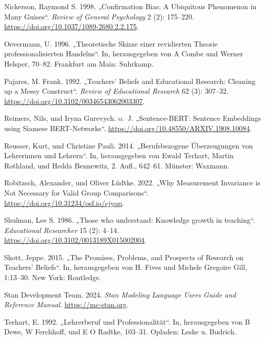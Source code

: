 \documentclass[
  letterpaper,
  DIV=11]{scrartcl}
\newlength{\cslhangindent}
\newenvironment{CSLReferences}[2] %
 {\begin{list}{}{%
  \setlength{\itemindent}{0pt}
  \setlength{\leftmargin}{0pt}
  \setlength{\parsep}{0pt}
  \ifodd #1
   \setlength{\leftmargin}{\cslhangindent}
   \setlength{\itemindent}{-1\cslhangindent}
  \fi
  \setlength{\itemsep}{#2\baselineskip}}}
 {\end{list}}
\begin{document}
\begin{CSLReferences}{1}{0}
Nickerson, Raymond S. 1998. {„Confirmation Bias: {A} Ubiquitous
Phenomenon in Many Guises``}. \emph{Review of General Psychology} 2 (2):
175--220. \url{https://doi.org/10.1037/1089-2680.2.2.175}.

Oevermann, U. 1996. {„Theoretische Skizze einer revidierten Theorie
professionalisierten Handelns``}. In, herausgegeben von A Combe und
Werner Helsper, 70--82. Frankfurt am Main: Suhrkamp.

Pajares, M. Frank. 1992. {„Teachers{'} Beliefs and Educational Research:
Cleaning up a Messy Construct``}. \emph{Review of Educational Research}
62 (3): 307--32. \url{https://doi.org/10.3102/00346543062003307}.

Reimers, Nils, und Iryna Gurevych. o.~J. {„Sentence-BERT: Sentence
Embeddings using Siamese BERT-Networks``}.
\url{https://doi.org/10.48550/ARXIV.1908.10084}.

Reusser, Kurt, und Christine Pauli. 2014. {„Berufsbezogene Überzeugungen
von Lehrerinnen und Lehrern``}. In, herausgegeben von Ewald Terhart,
Martin Rothland, und Hedda Bennewitz, 2. Aufl., 642--61. Münster:
Waxmann.

Robitzsch, Alexander, und Oliver Lüdtke. 2022. {„Why Measurement
Invariance is Not Necessary for Valid Group Comparisons``}.
\url{https://doi.org/10.31234/osf.io/cjyqp}.

Shulman, Lee S. 1986. {„Those who understand: Knowledge growth in
teaching``}. \emph{Educational Researcher} 15 (2): 4--14.
\url{https://doi.org/10.3102/0013189X015002004}.

Skott, Jeppe. 2015. {„The Promises, Problems, and Prospects of Research
on Teachers{'} Beliefs``}. In, herausgegeben von H. Fives und Michele
Gregoire Gill, 1:13--30. New York: Routledge.

Stan Development Team. 2024. \emph{Stan Modeling Language Users Guide
and Reference Manual}. \url{https://mc-stan.org}.

Terhart, E. 1992. {„Lehrerberuf und Professionalität``}. In,
herausgegeben von B Dewe, W Ferchhoff, und E O Radtke, 103--31. Opladen:
Leske u. Budrich.


\end{CSLReferences}
\end{document}

